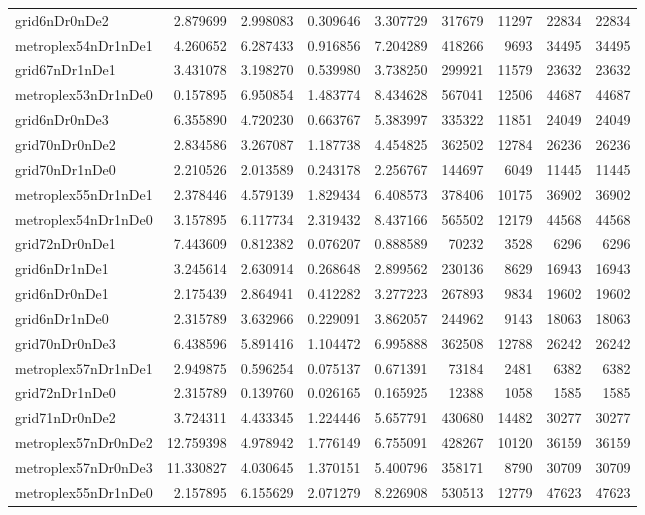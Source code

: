 \begin{longtable}{|l|r|r|r|r|r|r|r|r|}
grid6nDr0nDe2 & 2.879699 & 2.998083 & 0.309646 & 3.307729 & 317679 & 11297 & 22834 & 22834 \\
metroplex54nDr1nDe1 & 4.260652 & 6.287433 & 0.916856 & 7.204289 & 418266 & 9693 & 34495 & 34495 \\
grid67nDr1nDe1 & 3.431078 & 3.198270 & 0.539980 & 3.738250 & 299921 & 11579 & 23632 & 23632 \\
metroplex53nDr1nDe0 & 0.157895 & 6.950854 & 1.483774 & 8.434628 & 567041 & 12506 & 44687 & 44687 \\
grid6nDr0nDe3 & 6.355890 & 4.720230 & 0.663767 & 5.383997 & 335322 & 11851 & 24049 & 24049 \\
grid70nDr0nDe2 & 2.834586 & 3.267087 & 1.187738 & 4.454825 & 362502 & 12784 & 26236 & 26236 \\
grid70nDr1nDe0 & 2.210526 & 2.013589 & 0.243178 & 2.256767 & 144697 & 6049 & 11445 & 11445 \\
metroplex55nDr1nDe1 & 2.378446 & 4.579139 & 1.829434 & 6.408573 & 378406 & 10175 & 36902 & 36902 \\
metroplex54nDr1nDe0 & 3.157895 & 6.117734 & 2.319432 & 8.437166 & 565502 & 12179 & 44568 & 44568 \\
grid72nDr0nDe1 & 7.443609 & 0.812382 & 0.076207 & 0.888589 & 70232 & 3528 & 6296 & 6296 \\
grid6nDr1nDe1 & 3.245614 & 2.630914 & 0.268648 & 2.899562 & 230136 & 8629 & 16943 & 16943 \\
grid6nDr0nDe1 & 2.175439 & 2.864941 & 0.412282 & 3.277223 & 267893 & 9834 & 19602 & 19602 \\
grid6nDr1nDe0 & 2.315789 & 3.632966 & 0.229091 & 3.862057 & 244962 & 9143 & 18063 & 18063 \\
grid70nDr0nDe3 & 6.438596 & 5.891416 & 1.104472 & 6.995888 & 362508 & 12788 & 26242 & 26242 \\
metroplex57nDr1nDe1 & 2.949875 & 0.596254 & 0.075137 & 0.671391 & 73184 & 2481 & 6382 & 6382 \\
grid72nDr1nDe0 & 2.315789 & 0.139760 & 0.026165 & 0.165925 & 12388 & 1058 & 1585 & 1585 \\
grid71nDr0nDe2 & 3.724311 & 4.433345 & 1.224446 & 5.657791 & 430680 & 14482 & 30277 & 30277 \\
metroplex57nDr0nDe2 & 12.759398 & 4.978942 & 1.776149 & 6.755091 & 428267 & 10120 & 36159 & 36159 \\
metroplex57nDr0nDe3 & 11.330827 & 4.030645 & 1.370151 & 5.400796 & 358171 & 8790 & 30709 & 30709 \\
metroplex55nDr1nDe0 & 2.157895 & 6.155629 & 2.071279 & 8.226908 & 530513 & 12779 & 47623 & 47623 \\

\end{longtable}
